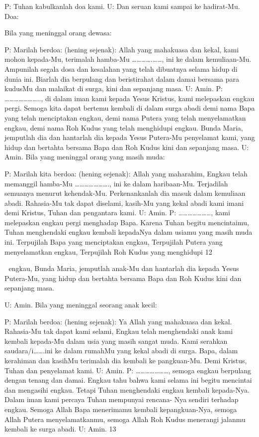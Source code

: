 \documentclass[10pt,a5paper,fancyhdr]{memoir}
\begin{document}
P: Tuhan kabulkanlah doa kami. 
U: Dan seruan kami sampai ke hadirat-Mu. 

Doa: 

Bila yang meninggal orang dewasa: 

P: Marilah berdoa: (hening sejenak): Allah yang mahakuasa dan 
kekal, kami mohon kepada-Mu, terimalah hamba-Mu 
………….……, ini ke dalam kemuliaan-Mu. Ampunilah segala dosa 
dan kesalahan yang telah dibuatnya selama hidup di dunia ini. 
Biarlah dia berpulang dan beristirahat dalam damai bersama para 
kudusMu dan malaikat di surga, kini dan sepanjang masa. 
U: Amin. 
P: ………………….., di dalam iman kami kepada Yesus Kristus, 
kami melepaskan engkau pergi. Semoga kita dapat bertemu kembali 
di dalam surga abadi demi nama Bapa yang telah menciptakan 
engkau, demi nama Putera yang telah menyelamatkan engkau, demi 
nama Roh Kudus yang telah menghidupi engkau. Bunda Maria, 
jemputlah dia dan hantarlah dia kepada Yesus Putera-Mu penyelamat 
kami, yang hidup dan bertahta bersama Bapa dan Roh Kudus kini 
dan sepanjang masa. 
U: Amin. 
Bila yang meninggal orang yang masih muda: 

P: Marilah kita berdoa: (hening sejenak): Allah yang maharahim, 
Engkau telah memanggil hamba-Mu …………………., ini ke dalam 
haribaan-Mu. Terjadilah semuanya menurut kehendak-Mu. 
Perkenankanlah dia masuk dalam kemuliaan abadi. Rahasia-Mu tak 
dapat diselami, kasih-Mu yang kekal abadi kami imani demi Kristus, 
Tuhan dan pengantara kami. 
U: Amin. 
P: …………………, kami melepaskan engkau pergi menghadap 
Bapa. Karena Tuhan begitu mencintaimu, Tuhan menghendaki 
engkau kembali kepadaNya dalam usiamu yang masih muda ini. 
Terpujilah Bapa yang menciptakan engkau, Terpujilah Putera yang 
menyelamatkan engkau, Terpujilah Roh Kudus yang menghidupi 
12 



engkau, Bunda Maria, jemputlah anak-Mu dan hantarlah dia kepada 
Yesus Putera-Mu, yang hidup dan bertahta bersama Bapa dan Roh 
Kudus kini dan sepanjang masa. 

U: Amin. 
Bila yang meninggal seorang anak kecil: 

P: Marilah berdoa: (hening sejenak): Ya Allah yang mahakuasa dan 
kekal. Rahasia-Mu tak dapat kami selami, Engkau telah menghendaki 
anak kami kembali kepada-Mu dalam usia yang masih sangat muda. 
Kami serahkan saudara/i…….ini ke dalam rumahMu yang kekal 
abadi di surga. Bapa, dalam kerahiman dan kasihMu terimalah dia 
kembali ke pangkuan-Mu. Demi Kristus, Tuhan dan penyelamat 
kami. 
U: Amin. 
P: …………………, semoga engkau berpulang dengan tenang dan 
damai. Engkau tahu bahwa kami selama ini begitu mencintai dan 
mengasihi engkau. Tetapi Tuhan menghendaki engkau kembali 
kepada-Nya. Dalam iman kami percaya Tuhan mempunyai rencana-
Nya sendiri terhadap engkau. Semoga Allah Bapa menerimamu 
kembali kepangkuan-Nya, semoga Allah Putera menyelamatkanmu, 
semoga Allah Roh Kudus menerangi jalanmu kembali ke surga 
abadi. 
U: Amin. 
13 
\end{document}
